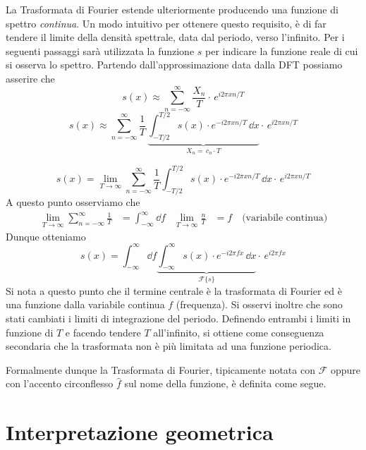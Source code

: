 La Trasformata di Fourier estende ulteriormente producendo una funzione di
spettro \emph{continua}.  Un modo intuitivo per ottenere questo requisito, \`e
di far tendere il limite della densit\`a spettrale, data dal periodo, verso
l'infinito.  Per i seguenti passaggi sar\`a utilizzata la funzione \(s\) per
indicare la funzione reale di cui si osserva lo spettro. Partendo
dall'approssimazione data dalla DFT possiamo asserire che
\[
    s(x) \approx \sum_{n=-\infty}^\infty \frac{X_n}{T}
        \cdot\,e^{i2\pi xn/T}
\]
\[
    s(x) \approx \sum_{n=-\infty}^\infty
        \frac{1}{T}\,
        \underbrace{
            \int_{-T/2}^{T/2} s(x)\cdot e^{-i2\pi xn/T}\,\dd{x}
        }_{X_n =\,c_n\cdot T}
        \cdot\,e^{i2\pi xn/T}
\]


\[
    s(x) = \lim_{T\to\infty} \sum_{n=-\infty}^\infty
        \frac{1}{T}\int_{-T/2}^{T/2} s(x)\cdot e^{-i2\pi xn/T}\,\dd{x}
        \cdot\,e^{i2\pi xn/T}
\]
A questo punto osserviamo che
\begin{align*}
    \lim_{T\to\infty} \sum_{n=-\infty}^\infty \frac{1}{T} &= \int_{-\infty}^\infty \dd{f} &
    \lim_{T\to\infty} \frac{n}{T} &= f \quad \text{(variabile continua)}
\end{align*}
Dunque otteniamo
\[
    s(x) = \int_{-\infty}^\infty \dd{f} 
           \underbrace{
               \int_{-\infty}^\infty s(x)\cdot e^{-i2\pi fx}\,\dd{x}
           }_{\mathcal{F}\{s\}}
           \cdot\,e^{i2\pi fx}
\]
Si nota a questo punto che il termine centrale \`e la trasformata di Fourier
ed \`e una funzione dalla variabile continua \(f\) (frequenza).
Si osservi inoltre che sono stati cambiati i limiti di integrazione del
periodo.  Definendo entrambi i limiti in funzione di \(T\) e facendo tendere
\(T\) all'infinito, si ottiene come conseguenza secondaria che la trasformata
non \`e pi\`u limitata ad una funzione periodica.

Formalmente dunque la Trasformata di Fourier, tipicamente notata con
\(\mathcal{F}\) oppure con l'accento circonflesso \(\hat{f}\) sul nome della
funzione, \`e definita come segue.

\noindent\fbox{\begin{minipage}{\textwidth}\[
    \mathcal{F}\{f\} = \hat{f}\,(\omega) 
    = \int_{-\infty}^\infty f(x)\cdot e^{-i\omega x}\,\dd{x}
\]\end{minipage}}

\section{Interpretazione geometrica}
